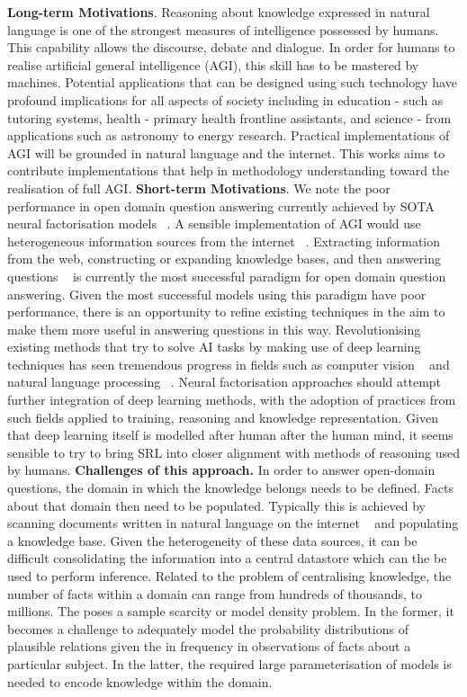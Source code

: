 \textbf{Long-term Motivations}. Reasoning about knowledge expressed in natural language is one of the strongest measures of intelligence possessed by humans. This capability allows the discourse, debate and dialogue. In order for humans to realise artificial general intelligence (AGI), this skill has to be mastered by machines. Potential applications that can be designed using such technology have profound implications for all aspects of society including in education - such as tutoring systems, health - primary health frontline assistants, and science - from applications such as astronomy to energy research. Practical implementations of AGI will be grounded in natural language and the internet. This works aims to contribute implementations that help in methodology understanding toward the realisation of full AGI.  \newline
\textbf{Short-term Motivations}. We note the poor performance in open domain question answering currently achieved by SOTA neural factorisation models ~\citep{balazevic2019hypernetwork, dettmers2018convolutional}. A sensible implementation of AGI would use heterogeneous information sources from the internet ~\citep{angeli2013philosophers}. Extracting information from the web, constructing or expanding knowledge bases, and then answering questions ~\citep{shalaby2019beyond} is currently the most successful paradigm for open domain question answering. Given the most successful models using this paradigm have poor performance, there is an opportunity to refine existing techniques in the aim to make them more useful in answering questions in this way. Revolutionising existing methods that try to solve AI tasks by making use of deep learning techniques has seen tremendous progress in fields such as computer vision ~\citep{hudson2018compositional}  and natural language processing ~\citep{peters2018deep}. Neural factorisation approaches should attempt further integration of deep learning methods, with the adoption of practices from such fields applied to training, reasoning and knowledge representation. Given that deep learning itself is modelled after human after the human mind, it seems sensible to try to bring SRL into closer alignment with methods of reasoning used by humans. \newline
\textbf{Challenges of this approach.}  In order to answer open-domain questions, the domain in which the knowledge belongs needs to be defined. Facts about that domain then need to be populated. Typically this is achieved by scanning documents written in natural language on the internet ~\citep{fader2011identifying, dong2014knowledge} and populating a knowledge base. Given the heterogeneity of these data sources, it can be difficult consolidating the information into a central datastore which can the be used to perform inference.  Related to the problem of centralising knowledge, the number of facts within a domain can range from hundreds of thousands, to millions. The poses a sample scarcity or model density problem. In the former, it becomes a challenge to adequately model the probability distributions of plausible relations given the in frequency in observations of facts about a particular subject. In the latter, the required large parameterisation of  models is needed to encode knowledge within the domain. \newline
